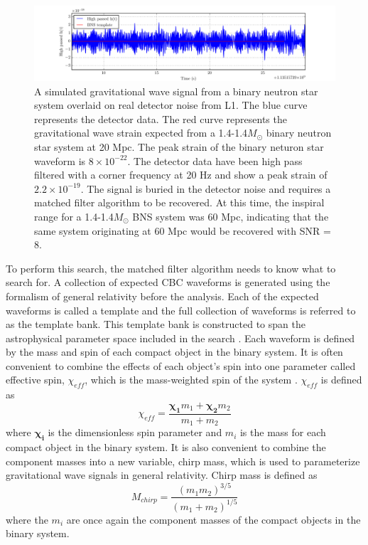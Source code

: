 \begin{figure}[ht!]
\includegraphics[width=\textwidth]{figures/introduction/quiet_BNS}
\caption[BNS signal in detector noise]{A simulated gravitational wave signal from a %
         binary neutron star system overlaid on real detector noise from L1. %
         The blue curve represents the detector data. The red curve represents %
         the gravitational wave strain expected from a 1.4-1.4$M_{\odot}$ %
         binary neutron star system %
         at 20 Mpc. The peak strain of the binary neturon star waveform is %
         $8\times10^{-22}$. %
         The detector data have been high pass filtered with a corner frequency %
         at 20 Hz and show a peak strain of $2.2\times10^{-19}$. The signal is %
         buried in the detector noise and requires a matched filter algorithm %
         to be recovered. At this time, the inspiral range for a 1.4-1.4$M_{\odot}$ %
         BNS system was 60 Mpc, indicating that the same system originating at 60 Mpc %
         would be recovered with SNR = 8. %
         }
\label{fig:quiet-BNS}
\end{figure}

To perform this search, the matched filter algorithm needs to know what to search for.
A collection of expected CBC waveforms is generated using
the formalism of general relativity before the analysis.
Each of the expected waveforms is called a template and
the full collection of waveforms is referred to as the template bank. This template bank
is constructed to span the astrophysical parameter space included in the search
\cite{GW150914-CBC}. Each waveform is defined by the mass and spin of each compact
object in the binary system. It is often convenient to combine the effects of each
object's spin into one parameter called effective spin, $\chi_{eff}$,
which is the
mass-weighted spin of the system \cite{Privitera:2013xza}. $\chi_{eff}$ is defined as
\begin{equation}
\chi_{eff} = \frac{\boldsymbol{\chi_{1}}m_{1} + \boldsymbol{\chi_{2}}m_{2}}{m_{1} + m_{2}}
\end{equation}
where $\boldsymbol{\chi_{i}}$ is the dimensionless spin parameter \cite{Kidder:1995zr}
and $m_{i}$ is the
mass for each compact object in the binary system. It is also convenient to combine
the component masses into a new variable, chirp mass, which is used to
parameterize gravitational wave signals in general relativity. Chirp mass is defined
as
\begin{equation}
M_{chirp} = \frac{(m_1m_2)^{3/5}}{(m_1 + m_2)^{1/5}}
\end{equation}
where the $m_{i}$ are once again the component masses of the compact objects in the
binary system.

